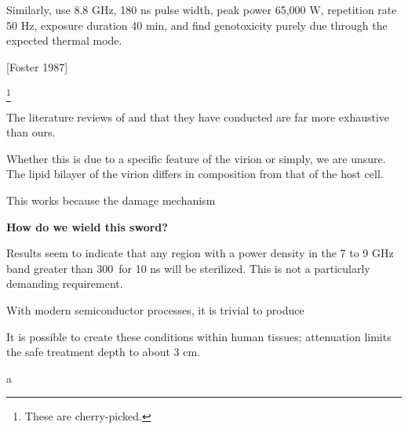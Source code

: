 \documentclass[fleqn,10pt]{paper}
\begin{document}
Similarly, \cite{DNA2004} use 8.8 GHz, 180 ns pulse width, peak power 65,000 W, repetition rate 50 Hz, exposure duration 40 min, and find genotoxicity purely due through the expected thermal mode. 

[Foster 1987]

\footnote{These are cherry-picked.}

The literature reviews of \cite{ICNIRP2020} and \cite{C95} that they have conducted are far more exhaustive than ours.

Whether this is due to a specific feature of the virion or simply, we are unsure. The lipid bilayer of the virion differs in composition from that of the host cell.

This works because the damage mechanism 

{\Large \textbf{How do we wield this sword?}}

Results seem to indicate that any region with a power density in the 7 to 9 GHz band greater than 300\Wsqm \ for 10 ns will be sterilized. This is not a particularly demanding requirement.

With modern semiconductor processes, it is trivial to produce 

It is possible to create these conditions within human tissues; attenuation limits the safe treatment depth to about 3 cm.

\begin{autem}
	a
\end{autem}


\clearpage

\printbibliography[heading=none, title={}]
\end{document}
